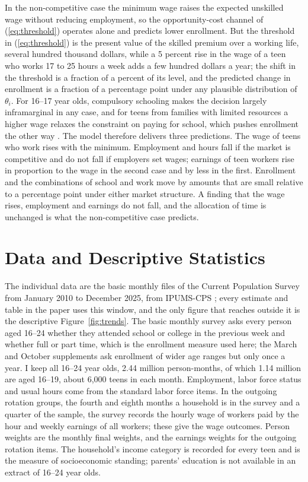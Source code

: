 \documentclass[12pt]{article}
\begin{document}
In the non-competitive case the minimum wage raises the expected unskilled wage without reducing employment, so the opportunity-cost channel of (\ref{eq:threshold}) operates alone and predicts lower enrollment. But the threshold in (\ref{eq:threshold}) is the present value of the skilled premium over a working life, several hundred thousand dollars, while a 5 percent rise in the wage of a teen who works 17 to 25 hours a week adds a few hundred dollars a year; the shift in the threshold is a fraction of a percent of its level, and the predicted change in enrollment is a fraction of a percentage point under any plausible distribution of $\theta_i$. For 16--17 year olds, compulsory schooling makes the decision largely inframarginal in any case, and for teens from families with limited resources a higher wage relaxes the constraint on paying for school, which pushes enrollment the other way \citep{ehrenberg1982,smith2021}. The model therefore delivers three predictions. The wage of teens who work rises with the minimum. Employment and hours fall if the market is competitive and do not fall if employers set wages; earnings of teen workers rise in proportion to the wage in the second case and by less in the first. Enrollment and the combinations of school and work move by amounts that are small relative to a percentage point under either market structure. A finding that the wage rises, employment and earnings do not fall, and the allocation of time is unchanged is what the non-competitive case predicts.

\section{Data and Descriptive Statistics}\label{sec:data}

The individual data are the basic monthly files of the Current Population Survey from January 2010 to December 2025, from IPUMS-CPS \citep{ipumscps}; every estimate and table in the paper uses this window, and the only figure that reaches outside it is the descriptive Figure~\ref{fig:trends}. The basic monthly survey asks every person aged 16--24 whether they attended school or college in the previous week and whether full or part time, which is the enrollment measure used here; the March and October supplements ask enrollment of wider age ranges but only once a year. I keep all 16--24 year olds, 2.44 million person-months, of which 1.14 million are aged 16--19, about 6,000 teens in each month. Employment, labor force status and usual hours come from the standard labor force items. In the outgoing rotation groups, the fourth and eighth months a household is in the survey and a quarter of the sample, the survey records the hourly wage of workers paid by the hour and weekly earnings of all workers; these give the wage outcomes. Person weights are the monthly final weights, and the earnings weights for the outgoing rotation items. The household's income category is recorded for every teen and is the measure of socioeconomic standing; parents' education is not available in an extract of 16--24 year olds.
\end{document}
